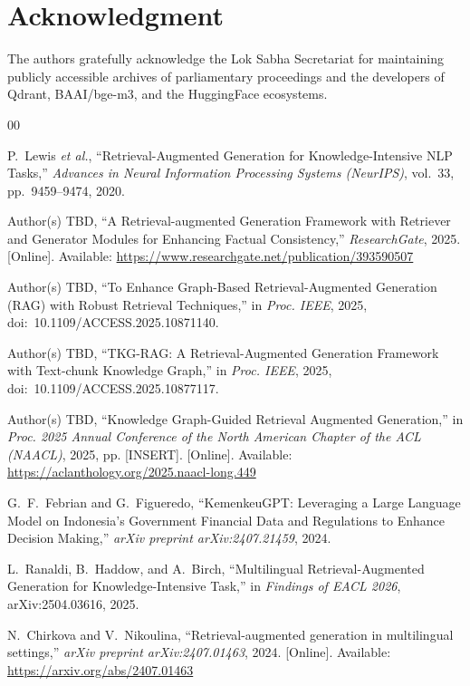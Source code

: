 \documentclass[conference]{IEEEtran}
\begin{document}
\section*{Acknowledgment}
The authors gratefully acknowledge the Lok Sabha Secretariat for maintaining
publicly accessible archives of parliamentary proceedings and the developers
of Qdrant, BAAI/bge-m3, and the HuggingFace ecosystems.

\begin{thebibliography}{00}

  P.~Lewis \textit{et al.},
  ``Retrieval-Augmented Generation for Knowledge-Intensive NLP Tasks,''
  \textit{Advances in Neural Information Processing Systems (NeurIPS)},
  vol.~33, pp.~9459--9474, 2020.

  Author(s) TBD,
  ``A Retrieval-augmented Generation Framework with Retriever and Generator
  Modules for Enhancing Factual Consistency,''
  \textit{ResearchGate}, 2025. [Online]. Available:
  \url{https://www.researchgate.net/publication/393590507}

  Author(s) TBD,
  ``To Enhance Graph-Based Retrieval-Augmented Generation (RAG) with Robust
  Retrieval Techniques,''
  in \textit{Proc. IEEE}, 2025, doi:~10.1109/ACCESS.2025.10871140.

  Author(s) TBD,
  ``TKG-RAG: A Retrieval-Augmented Generation Framework with Text-chunk
  Knowledge Graph,''
  in \textit{Proc. IEEE}, 2025, doi:~10.1109/ACCESS.2025.10877117.

  Author(s) TBD,
  ``Knowledge Graph-Guided Retrieval Augmented Generation,''
  in \textit{Proc. 2025 Annual Conference of the North American Chapter of
  the ACL (NAACL)}, 2025, pp. [INSERT]. [Online]. Available:
  \url{https://aclanthology.org/2025.naacl-long.449}

  G.~F.~Febrian and G.~Figueredo,
  ``KemenkeuGPT: Leveraging a Large Language Model on Indonesia's Government
  Financial Data and Regulations to Enhance Decision Making,''
  \textit{arXiv preprint arXiv:2407.21459}, 2024.

  L.~Ranaldi, B.~Haddow, and A.~Birch,
  ``Multilingual Retrieval-Augmented Generation for Knowledge-Intensive
  Task,''
  in \textit{Findings of EACL 2026}, arXiv:2504.03616, 2025.

  N.~Chirkova and V.~Nikoulina,
  ``Retrieval-augmented generation in multilingual settings,''
  \textit{arXiv preprint arXiv:2407.01463}, 2024. [Online]. Available:
  \url{https://arxiv.org/abs/2407.01463}

\end{thebibliography}

\balance
\end{document}
